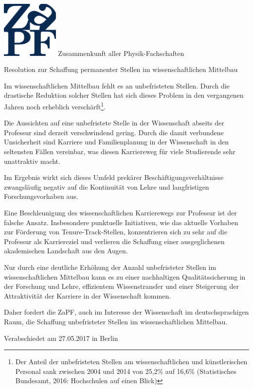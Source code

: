 \documentclass[DIV=calc]{scrartcl}
\begin{document}
    \hspace{0.87\textwidth}
    \begin{minipage}{120pt}
        \vspace{-1.8cm}
        \includegraphics[width=80pt]{logo.pdf}
        \centering
        \small Zusammenkunft aller Physik-Fachschaften
    \end{minipage}
    \begin{center}
        \huge{Resolution zur Schaffung permanenter Stellen im wissenschaftlichen Mittelbau} \\
        \normalsize
    \end{center}
    
    \vspace{1cm}    
     Im wissenschaftlichen Mittelbau fehlt es an unbefristeten Stellen. Durch die drastische Reduktion solcher Stellen hat sich dieses Problem in den vergangenen Jahren noch erheblich verschärft\footnote{Der Anteil der unbefristeten Stellen am wissenschaftlichen und künstlerischen Personal sank zwischen 2004 und 2014 von 25,2\% auf 16,6\% (Statistisches Bundesamt, 2016: Hochschulen auf einen Blick)}.

Die Aussichten auf eine unbefristete Stelle in der Wissenschaft abseits der Professur sind derzeit verschwindend gering.
Durch die damit verbundene Unsicherheit sind Karriere und Familienplanung in der Wissenschaft in den seltensten Fällen vereinbar, was diesen Karriereweg für viele Studierende sehr unattraktiv macht.

Im Ergebnis wirkt sich dieses Umfeld prekärer Beschäftigungsverhältnisse zwangsläufig negativ auf die Kontinuität von Lehre und langfristigen Forschungsvorhaben aus.

Eine Beschleunigung des wissenschaftlichen Karrierewegs zur Professur ist der falsche Ansatz. Insbesondere punktuelle Initiativen, wie das aktuelle Vorhaben zur Förderung von Tenure-Track-Stellen, konzentrieren sich zu sehr auf die Professur als Karriereziel und verlieren die Schaffung einer ausgeglichenen akademischen Landschaft aus den Augen.

Nur durch eine deutliche Erhöhung der Anzahl unbefristeter Stellen im wissenschaftlichen Mittelbau kann es zu einer nachhaltigen Qualitätssicherung in der Forschung und Lehre, effizientem Wissenstransfer und einer Steigerung der Attraktivität der Karriere in der Wissenschaft kommen.

Daher fordert die ZaPF, auch im Interesse der Wissenschaft im deutschsprachigen Raum, die Schaffung unbefristeter Stellen im wissenschaftlichen Mittelbau.
    
    \vfill
    \begin{flushright}
        Verabschiedet am 27.05.2017 in Berlin
    \end{flushright}

    
\end{document}
